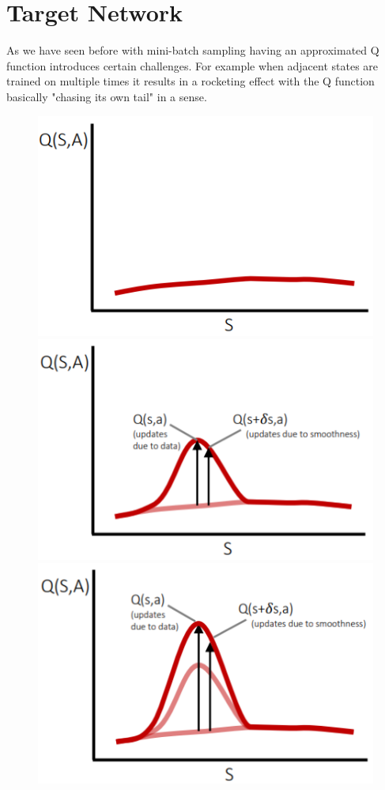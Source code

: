 \section{Target Network }

As we have seen before with mini-batch sampling having an approximated Q function introduces certain challenges. 
For example when adjacent states are trained on multiple times
it results in a rocketing effect with the Q function basically "chasing its own tail" in a sense.  
\begin{figure}[h!h!h!h]
\centering
\includegraphics[scale=0.5]{figures/target 1.PNG}
\includegraphics[scale=0.5]{figures/target 2.PNG}\\
\includegraphics[scale=0.5]{figures/target 3.PNG}

\end{figure}
